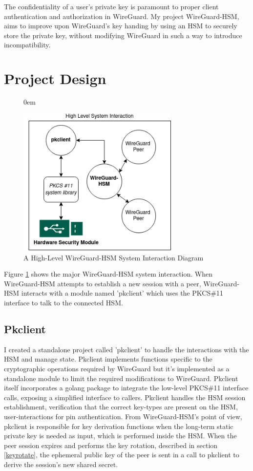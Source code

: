 \documentclass [11pt, proquest] {uwthesis}[2020/02/24]
\begin{document}
The confidentiality of a user's private key is paramount to proper client authentication and authorization in WireGuard. My project WireGuard-HSM, aims to improve upon WireGuard's key handing by using an HSM to securely store the private key, without modifying WireGuard in such a way to introduce incompatibility.

\section{Project Design}
\begin{figure}
\itemsep0em 
\begin{center}
\includegraphics[width=8cm]{paper/images/high-level-overview.png}
\caption{A High-Level WireGuard-HSM System Interaction Diagram}
\label{fig:highlevel_system}
\end{center}
\end{figure}
Figure \ref{fig:highlevel_system} shows the major WireGuard-HSM system interaction. When WireGuard-HSM attempts to establish a new session with a peer, WireGuard-HSM interacts with a module named 'pkclient' which uses the PKCS\#11 interface to talk to the connected HSM. 

\subsection{Pkclient}
\label{pk_design}
I created a standalone project called 'pkclient' to handle the interactions with the HSM and manage state. Pkclient implements functions specific to the cryptographic operations required by WireGuard but it's implemented as a standalone module to limit the required modifications to WireGuard. Pkclient itself incorporates a golang package to integrate the low-level PKCS\#11 interface calls, exposing a simplified interface to callers.  Pkclient handles the HSM session establishment, verification that the correct key-types are present on the HSM, user-interactions for pin authentication. 
From WireGuard-HSM's point of view, pkclient is responsible for key derivation functions when the long-term static private key is needed as input, which is performed inside the HSM. When the peer session expires and performs the key rotation, described in section \ref{keyrotate}, the ephemeral public key of the peer is sent in a call to pkclient to derive the session's new shared secret. 
\end{document}
